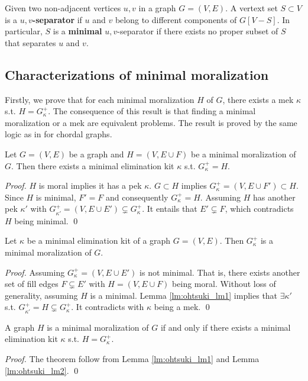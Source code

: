 \begin{definition}
Given two non-adjacent vertices $u,v$ in a graph $G=(V,E)$. A vertext set $S \subset V$ is a \textbf{$u,v$-separator} if $u$ and $v$ belong to different components of $G[V-S]$. In particular, $S$ is a \textbf{minimal} $u,v$-separator if there exists no proper subset of $S$ that separates $u$ and $v$. 
\end{definition}

\subsection{Characterizations of minimal moralization}
Firstly, we prove that for each minimal moralization $H$ of $G$, there exists a mek $\kappa$ s.t. $H=G_{\kappa}^+$. The consequence of this result is that finding a minimal moralization or a mek are equivalent problems. The result is proved by the same logic as in \cite{ohtsuki1976minimal} for chordal graphs. 
\begin{lemma}
\label{lm:ohtsuki_lm1}
Let $G=(V,E)$ be a graph and $H=(V,E\cup F)$ be a minimal moralization of $G$. Then there exists a minimal elimination kit $\kappa$ s.t. $G_{\kappa}^+=H$. 
\end{lemma}
\begin{proof}
$H$ is moral implies it has a pek $\kappa$. $G \subset H$ implies $G_{\kappa}^+=(V,E\cup F') \subset H$. Since $H$ is minimal, $F'=F$ and consequently $G_{\kappa}^+=H$. Assuming $H$ has another pek $\kappa'$ with $G_{\kappa'}^+ =(V,E\cup E') \subsetneq G_{\kappa}^+$. It entails that $E' \subsetneq F$, which contradicts $H$ being minimal. \qed
\end{proof}

\begin{lemma}
\label{lm:ohtsuki_lm2}
Let $\kappa$ be a minimal elimination kit of a graph $G=(V,E)$. Then $G_{\kappa}^+$ is a minimal moralization of $G$. 
\end{lemma}
\begin{proof}
Assuming $G_{\kappa}^+=(V,E\cup E')$ is not minimal. That is, there exists another set of fill edges $F\subsetneq E'$ with $H=(V,E\cup F)$ being moral. Without loss of generality, assuming $H$ is a minimal. Lemma \ref{lm:ohtsuki_lm1} implies that $\exists \kappa'$ s.t. $G_{\kappa'}^+=H \subsetneq G_{\kappa}^+$. It contradicts with $\kappa$ being a mek. \qed
\end{proof}

\begin{theorem}
\label{thm:ohtsuki_thm1}
A graph $H$ is a minimal moralization of $G$ if and only if there exists a minimal elimination kit $\kappa$ s.t. $H=G_{\kappa}^+$.
\end{theorem}
\begin{proof}
The theorem follow from Lemma \ref{lm:ohtsuki_lm1} and Lemma \ref{lm:ohtsuki_lm2}. \qed 
\end{proof}

